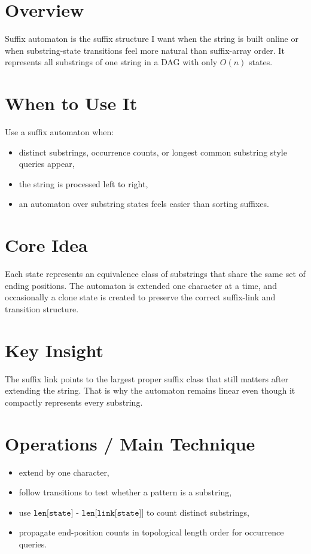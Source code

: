 \section*{Overview}

Suffix automaton is the suffix structure I want when the string is built online or when substring-state transitions feel
more natural than suffix-array order. It represents all substrings of one string in a DAG with only \(O(n)\) states.

\section*{When to Use It}

Use a suffix automaton when:

\begin{itemize}
  \item distinct substrings, occurrence counts, or longest common substring style queries appear,
  \item the string is processed left to right,
  \item an automaton over substring states feels easier than sorting suffixes.
\end{itemize}

\section*{Core Idea}

Each state represents an equivalence class of substrings that share the same set of ending positions. The automaton is
extended one character at a time, and occasionally a clone state is created to preserve the correct suffix-link and
transition structure.

\section*{Key Insight}

The suffix link points to the largest proper suffix class that still matters after extending the string. That is why the
automaton remains linear even though it compactly represents every substring.

\section*{Operations / Main Technique}

\begin{itemize}
  \item extend by one character,
  \item follow transitions to test whether a pattern is a substring,
  \item use \(\texttt{len[state] - len[link[state]]}\) to count distinct substrings,
  \item propagate end-position counts in topological length order for occurrence queries.
\end{itemize}

